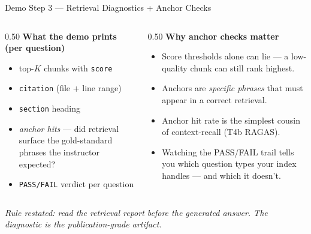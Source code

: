 \begin{frame}{Demo Step 3 --- Retrieval Diagnostics + Anchor Checks}
\begin{columns}[T]
\begin{column}{0.50\textwidth}
\textbf{What the demo prints (per question)}
\begin{itemize}\small
\item top-$K$ chunks with \texttt{score}
\item \texttt{citation} (file + line range)
\item \texttt{section} heading
\item \emph{anchor hits} --- did retrieval surface the gold-standard phrases the instructor expected?
\item \texttt{PASS/FAIL} verdict per question
\end{itemize}
\end{column}
\begin{column}{0.50\textwidth}
\textbf{Why anchor checks matter}
\begin{itemize}\small
\item Score thresholds alone can lie --- a low-quality chunk can still rank highest.
\item Anchors are \emph{specific phrases} that must appear in a correct retrieval.
\item Anchor hit rate is the simplest cousin of context-recall (T4b RAGAS).
\item Watching the PASS/FAIL trail tells you which question types your index handles --- and which it doesn't.
\end{itemize}
\end{column}
\end{columns}

\vspace{0.2cm}
\centering\textit{Rule restated: read the retrieval report \emph{before} the generated answer. The diagnostic is the publication-grade artifact.}
\end{frame}


